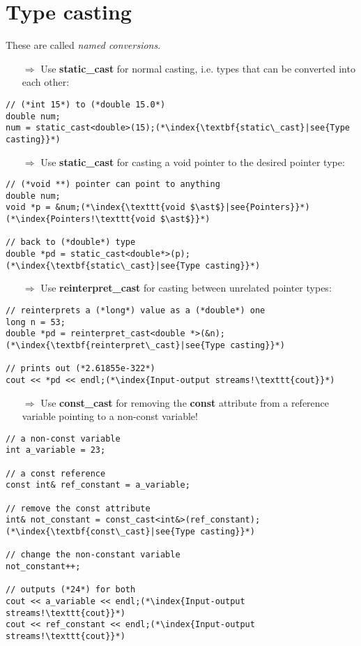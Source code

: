 \documentclass[10pt]{article}
\begin{document}
\section{Type casting}
\small
These are called \emph{named conversions}.
\begin{enumerate}
\item[$\Rightarrow$] Use \textbf{static\_cast} for normal casting, i.e. types that can be converted into each other:
\end{enumerate}
\begin{lstlisting}
// (*int 15*) to (*double 15.0*)
double num;
num = static_cast<double>(15);(*\index{\textbf{static\_cast}|see{Type casting}}*)
\end{lstlisting}
\begin{enumerate}
\item[$\Rightarrow$] Use \textbf{static\_cast} for casting a void pointer to the desired pointer type:
\end{enumerate}
\begin{lstlisting}
// (*void **) pointer can point to anything
double num;
void *p = &num;(*\index{\texttt{void $\ast$}|see{Pointers}}*)(*\index{Pointers!\texttt{void $\ast$}}*) 

// back to (*double*) type
double *pd = static_cast<double*>(p);(*\index{\textbf{static\_cast}|see{Type casting}}*)
\end{lstlisting}
\begin{enumerate}
\item[$\Rightarrow$] Use \textbf{reinterpret\_cast} for casting between unrelated pointer types:
\end{enumerate}
\begin{lstlisting}
// reinterprets a (*long*) value as a (*double*) one
long n = 53;
double *pd = reinterpret_cast<double *>(&n);(*\index{\textbf{reinterpret\_cast}|see{Type casting}}*)

// prints out (*2.61855e-322*)
cout << *pd << endl;(*\index{Input-output streams!\texttt{cout}}*)
\end{lstlisting}
\begin{enumerate}
\item[$\Rightarrow$] Use \textbf{const\_cast} for removing the \textbf{const} attribute from a reference variable pointing to a non-const variable!
\end{enumerate}
\begin{lstlisting}
// a non-const variable
int a_variable = 23;

// a const reference
const int& ref_constant = a_variable;

// remove the const attribute
int& not_constant = const_cast<int&>(ref_constant);(*\index{\textbf{const\_cast}|see{Type casting}}*)

// change the non-constant variable
not_constant++;

// outputs (*24*) for both
cout << a_variable << endl;(*\index{Input-output streams!\texttt{cout}}*)
cout << ref_constant << endl;(*\index{Input-output streams!\texttt{cout}}*)
\end{lstlisting}
\end{document}

